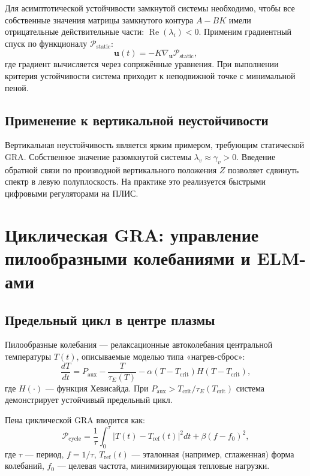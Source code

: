 \documentclass[12pt,a4paper]{article}
\numberwithin{equation}{section}
\begin{document}
Для асимптотической устойчивости замкнутой системы необходимо, чтобы все собственные значения матрицы замкнутого контура $A - BK$ имели отрицательные действительные части: $\operatorname{Re}(\lambda_i) < 0$. Применим градиентный спуск по функционалу $\mathcal{P}_{\text{static}}$:
\begin{equation}
\mathbf{u}(t) = -K \nabla_{\mathbf{u}} \mathcal{P}_{\text{static}},
\end{equation}
где градиент вычисляется через сопряжённые уравнения. При выполнении критерия устойчивости система приходит к неподвижной точке с минимальной пеной.

\subsection{Применение к вертикальной неустойчивости}
Вертикальная неустойчивость является ярким примером, требующим статической GRA. Собственное значение разомкнутой системы $\lambda_v \approx \gamma_v > 0$. Введение обратной связи по производной вертикального положения $Z$ позволяет сдвинуть спектр в левую полуплоскость. На практике это реализуется быстрыми цифровыми регуляторами на ПЛИС.

\section{Циклическая GRA: управление пилообразными колебаниями и ELM-ами}
\label{sec:cyclic}

\subsection{Предельный цикл в центре плазмы}
Пилообразные колебания --- релаксационные автоколебания центральной температуры $T(t)$, описываемые моделью типа «нагрев-сброс»:
\begin{equation}
\frac{dT}{dt} = P_{\text{aux}} - \frac{T}{\tau_E(T)} - \alpha (T - T_{\text{crit}}) H(T - T_{\text{crit}}),
\label{eq:sawtooth}
\end{equation}
где $H(\cdot)$ --- функция Хевисайда. При $P_{\text{aux}} > T_{\text{crit}}/\tau_E(T_{\text{crit}})$ система демонстрирует устойчивый предельный цикл.

Пена циклической GRA вводится как:
\begin{equation}
\mathcal{P}_{\text{cycle}} = \frac{1}{\tau} \int_0^{\tau} |T(t) - T_{\text{ref}}(t)|^2 dt + \beta (f - f_0)^2,
\label{eq:Pcycle}
\end{equation}
где $\tau$ --- период, $f=1/\tau$, $T_{\text{ref}}(t)$ --- эталонная (например, сглаженная) форма колебаний, $f_0$ --- целевая частота, минимизирующая тепловые нагрузки.
\end{document}
